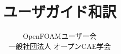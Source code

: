 \documentclass{OFbook}
\title{ユーザガイド和訳}
\author{OpenFOAMユーザー会\\
        一般社団法人 オープンCAE学会}
\begin{document}
\maketitle
\frontmatter

\begin{OFdeclaration}
 
 
 
\end{OFdeclaration}

\tableofcontents

\mainmatter








\backmatter
\printindex
\end{document}
